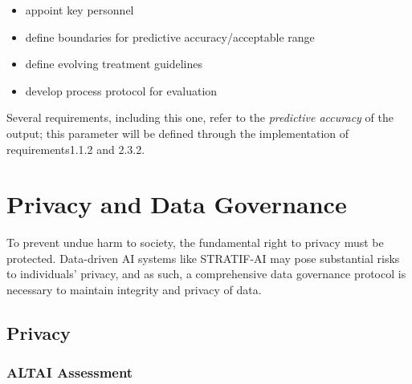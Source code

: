 \documentclass[
  letterpaper,
  DIV=11,
  numbers=noendperiod]{scrreport}
\providecommand{\tightlist}{%
  \setlength{\itemsep}{0pt}\setlength{\parskip}{0pt}}\usepackage{longtable,booktabs,array}
\begin{document}
\begin{itemize}
\tightlist
\item
  appoint key personnel
\item
  define boundaries for predictive accuracy/acceptable range
\item
  define evolving treatment guidelines
\item
  develop process protocol for evaluation
\end{itemize}

\begin{tcolorbox}[enhanced jigsaw, arc=.35mm, breakable, coltitle=black, toptitle=1mm, colbacktitle=quarto-callout-note-color!10!white, toprule=.15mm, left=2mm, bottomrule=.15mm, opacitybacktitle=0.6, titlerule=0mm, colback=white, opacityback=0, title=\textcolor{quarto-callout-note-color}{\faInfo}\hspace{0.5em}{Note}, bottomtitle=1mm, colframe=quarto-callout-note-color-frame, leftrule=.75mm, rightrule=.15mm]

Several requirements, including this one, refer to the \emph{predictive
accuracy} of the output; this parameter will be defined through the
implementation of requirements1.1.2 and 2.3.2.

\end{tcolorbox}


\hypertarget{privacy-and-data-governance}{%
\chapter{Privacy and Data
Governance}\label{privacy-and-data-governance}}

To prevent undue harm to society, the fundamental right to privacy must
be protected. Data-driven AI systems like STRATIF-AI may pose
substantial risks to individuals' privacy, and as such, a comprehensive
data governance protocol is necessary to maintain integrity and privacy
of data.

\hypertarget{privacy}{%
\section{Privacy}\label{privacy}}

\hypertarget{altai-assessment-6}{%
\subsection*{ALTAI Assessment}\label{altai-assessment-6}}
\end{document}
